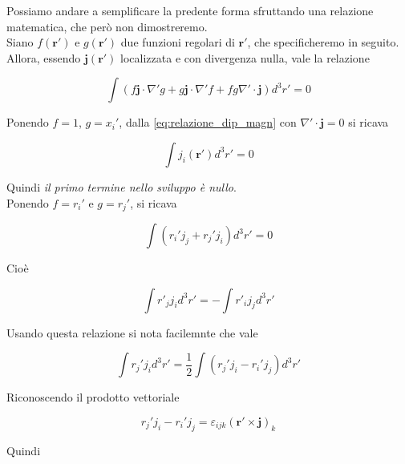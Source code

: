 Possiamo andare a semplificare la predente forma sfruttando una relazione matematica, che però non dimostreremo.\\

Siano $f(\mathbf{r'})$ e $g(\mathbf{r'})$ due funzioni regolari di $\mathbf{r'}$, che specificheremo in seguito. Allora, essendo $\mathbf{j}(\mathbf{r'})$ localizzata e con divergenza nulla, vale la relazione

\begin{tcolorbox}[colback=yellow!10!white, colframe=orange!70!black, boxrule=0.8pt]
\begin{equation} \label{eq:relazione_dip_magn}
    \int (f \mathbf{j} \cdot \nabla' g + g \mathbf{j} \cdot \nabla ' f  + fg \nabla' \cdot \mathbf{j}) d^3 r' = 0
\end{equation}
\end{tcolorbox}

Ponendo $f = 1$, $g = x_i'$, dalla \ref{eq:relazione_dip_magn} con $\nabla' \cdot \mathbf{j} = 0$ si ricava 

\begin{equation*}
    \int j_i (\mathbf{r'}) d^3 r' = 0
\end{equation*}

Quindi \emph{il primo termine nello sviluppo è nullo}. \\

Ponendo $f = r_i'$ e $g = r_j '$, si ricava 

\begin{equation*}
    \int (r_i' j_j + r_j' j_i) d^3 r' = 0
\end{equation*}

Cioè 

\begin{equation*}
    \int r'_j j _i d^3 r' = - \int r'_i j_j d^3 r' 
\end{equation*}

Usando questa relazione si nota facilemnte che vale 

\begin{equation*}
    \int r_j' j_i d^3 r' = \frac{1}{2} \int (r_j' j_i- r_i' j_j) d^3 r' 
\end{equation*}

Riconoscendo il prodotto vettoriale 

\begin{equation*}
    r_j' j_i- r_i' j_j = \varepsilon_{ijk} (\mathbf{r'} \times \mathbf{j})_k
\end{equation*}

Quindi 

